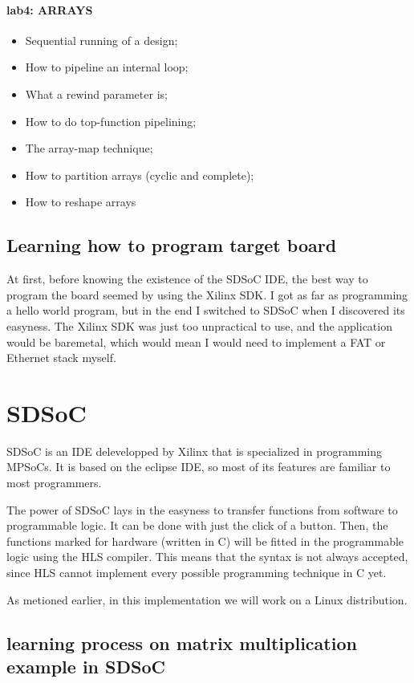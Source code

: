 \paragraph{lab4: ARRAYS}
\begin{itemize}
	\item Sequential running of a design;
	\item How to pipeline an internal loop;
	\item What a rewind parameter is;
	\item How to do top-function pipelining;
	\item The array-map technique;
	\item How to partition arrays (cyclic and complete);
	\item How to reshape arrays
\end{itemize}

\subsection{Learning how to program target board}

At first, before knowing the existence of the SDSoC IDE, the best way to program the board seemed by using the Xilinx SDK. I got as far as programming a hello world program, but in the end I switched to SDSoC when I discovered its easyness. The Xilinx SDK was just too unpractical to use, and the application would be baremetal, which would mean I would need to implement a FAT or Ethernet stack myself.

\section{SDSoC}

SDSoC is an IDE delevelopped by Xilinx that is specialized in programming MPSoCs. It is based on the eclipse IDE, so most of its features are familiar to most programmers. 

The power of SDSoC lays in the easyness to transfer functions from software to programmable logic. It can be done with just the click of a button. Then, the functions marked for hardware (written in C) will be fitted in the programmable logic using the HLS compiler. This means that the syntax is not always accepted, since HLS cannot implement every possible programming technique in C yet.

As metioned earlier, in this implementation we will work on a Linux distribution.

\subsection{learning process on matrix multiplication example in SDSoC}

